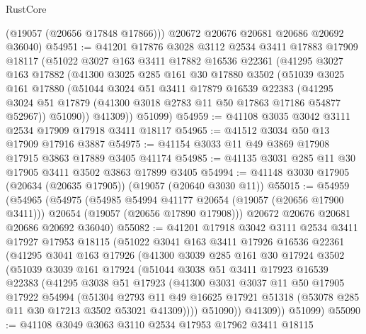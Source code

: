 \begin{lexlean}{RustCore}
\begin{coremodule}
        (@19057 (@20656 @17848 @17866)))
      @20672
      @20676
      @20681
      @20686
      @20692
      @36040)
@54951 := @41201
    @17876
    @3028
    @3112
    @2534
    @3411
    @17883
    @17909
    @18117
    (@51022
      @3027
      @163
      @3411
      @17882
      @16536
      @22361
      (@41295
        @3027
        @163
        @17882
        (@41300
          @3025
          @285
          @161
          @30
          @17880
          @3502
          (@51039
            @3025
            @161
            @17880
            (@51044
              @3024
              @51
              @3411
              @17879
              @16539
              @22383
              (@41295 @3024 @51 @17879 (@41300 @3018 @2783 @11 @50 @17863 @17186 @54877 @52967))
              @51090))
          @41309))
      @51099)
@54959 := @41108 @3035 @3042 @3111 @2534 @17909 @17918 @3411 @18117
@54965 := @41512 @3034 @50 @13 @17909 @17916 @3887
@54975 := @41154 @3033 @11 @49 @3869 @17908 @17915 @3863 @17889 @3405 @41174
@54985 := @41135 @3031 @285 @11 @30 @17905 @3411 @3502 @3863 @17899 @3405
@54994 := @41148 @3030 @17905 (@20634 (@20635 @17905)) (@19057 (@20640 @3030 @11))
@55015 := @54959
    (@54965
      (@54975
        (@54985 @54994 @41177 @20654 (@19057 (@20656 @17900 @3411)))
        @20654
        (@19057 (@20656 @17890 @17908)))
      @20672
      @20676
      @20681
      @20686
      @20692
      @36040)
@55082 := @41201
    @17918
    @3042
    @3111
    @2534
    @3411
    @17927
    @17953
    @18115
    (@51022
      @3041
      @163
      @3411
      @17926
      @16536
      @22361
      (@41295
        @3041
        @163
        @17926
        (@41300
          @3039
          @285
          @161
          @30
          @17924
          @3502
          (@51039
            @3039
            @161
            @17924
            (@51044
              @3038
              @51
              @3411
              @17923
              @16539
              @22383
              (@41295
                @3038
                @51
                @17923
                (@41300
                  @3031
                  @3037
                  @11
                  @50
                  @17905
                  @17922
                  @54994
                  (@51304
                    @2793
                    @11
                    @49
                    @16625
                    @17921
                    @51318
                    (@53078 @285 @11 @30 @17213 @3502 @53021 @41309))))
              @51090))
          @41309))
      @51099)
@55090 := @41108 @3049 @3063 @3110 @2534 @17953 @17962 @3411 @18115

\end{coremodule}
\end{lexlean}
